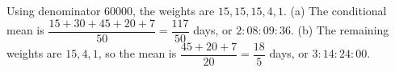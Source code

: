 Using denominator $60000$, the weights are $15,15,15,4,1$. (a) The conditional mean is $\dfrac{15+30+45+20+7}{50}=\dfrac{117}{50}$ days, or $\boxed{2:08:09:36}$. (b) The remaining weights are $15,4,1$, so the mean is $\dfrac{45+20+7}{20}=\dfrac{18}{5}$ days, or $\boxed{3:14:24:00}$.
